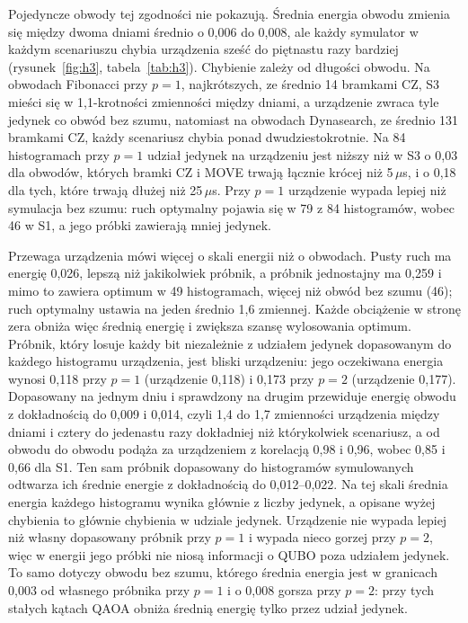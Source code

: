 \documentclass{scspaperproc}
\begin{document}
Pojedyncze obwody tej zgodności nie pokazują. Średnia energia obwodu zmienia
się między dwoma dniami średnio o 0,006 do 0,008, ale każdy symulator w każdym
scenariuszu chybia urządzenia sześć do piętnastu razy bardziej
(rysunek~\ref{fig:h3}, tabela~\ref{tab:h3}). Chybienie zależy od długości
obwodu. Na obwodach Fibonacci przy $p = 1$, najkrótszych, ze średnio 14
bramkami CZ, S3 mieści się w 1,1-krotności zmienności między dniami,
a urządzenie zwraca tyle jedynek co obwód bez szumu, natomiast na obwodach
Dynasearch, ze średnio 131 bramkami CZ, każdy scenariusz chybia ponad
dwudziestokrotnie. Na 84 histogramach przy $p = 1$ udział jedynek na
urządzeniu jest niższy niż w S3 o 0,03 dla obwodów, których bramki CZ i MOVE
trwają łącznie krócej niż 5\,$\mu$s, i o 0,18 dla tych, które trwają dłużej niż
25\,$\mu$s. Przy $p = 1$ urządzenie wypada lepiej niż symulacja bez szumu:
ruch optymalny pojawia się w 79 z 84 histogramów, wobec 46 w S1, a jego próbki
zawierają mniej jedynek.

Przewaga urządzenia mówi więcej o skali energii niż o obwodach. Pusty ruch
ma energię 0,026, lepszą niż jakikolwiek próbnik, a próbnik jednostajny ma
0,259 i mimo to zawiera optimum w 49 histogramach, więcej niż obwód bez szumu
(46); ruch optymalny ustawia na jeden średnio 1,6 zmiennej. Każde obciążenie
w stronę zera obniża więc średnią energię i zwiększa szansę wylosowania
optimum. Próbnik, który losuje każdy bit niezależnie z udziałem jedynek
dopasowanym do każdego histogramu urządzenia, jest bliski urządzeniu: jego
oczekiwana energia wynosi 0,118 przy $p = 1$ (urządzenie 0,118) i 0,173 przy
$p = 2$ (urządzenie 0,177). Dopasowany na jednym dniu i sprawdzony na drugim
przewiduje energię obwodu z dokładnością do 0,009 i 0,014, czyli 1,4 do 1,7
zmienności urządzenia między dniami i cztery do jedenastu razy dokładniej niż
którykolwiek scenariusz, a od obwodu do obwodu podąża za urządzeniem
z korelacją 0,98 i 0,96, wobec 0,85 i 0,66 dla S1. Ten sam próbnik dopasowany
do histogramów symulowanych odtwarza ich średnie energie z dokładnością do 0,012--0,022. Na tej skali średnia energia każdego histogramu wynika
głównie z liczby jedynek, a opisane wyżej chybienia to głównie chybienia
w udziale jedynek. Urządzenie nie wypada lepiej niż własny dopasowany próbnik
przy $p = 1$ i wypada nieco gorzej przy $p = 2$, więc w energii jego próbki nie
niosą informacji o QUBO poza udziałem jedynek. To samo dotyczy obwodu bez
szumu, którego średnia energia jest w granicach 0,003 od własnego próbnika
przy $p = 1$ i o 0,008 gorsza przy $p = 2$: przy tych stałych kątach QAOA
obniża średnią energię tylko przez udział jedynek.
\end{document}
